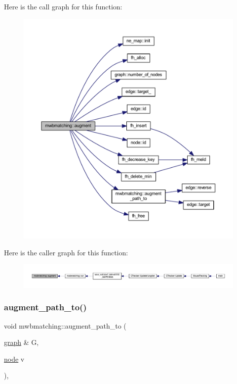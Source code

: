 Here is the call graph for this function\+:\nopagebreak
\begin{figure}[H]
\begin{center}
\leavevmode
\includegraphics[width=350pt]{classmwbmatching_adfb6ea829377c6ba08f6079d767d5a42_cgraph}
\end{center}
\end{figure}
Here is the caller graph for this function\+:\nopagebreak
\begin{figure}[H]
\begin{center}
\leavevmode
\includegraphics[width=350pt]{classmwbmatching_adfb6ea829377c6ba08f6079d767d5a42_icgraph}
\end{center}
\end{figure}
\mbox{\label{classmwbmatching_a241fe1b645070b1f3e96c0b100fb8a6f}} 
\subsubsection{\texorpdfstring{augment\+\_\+path\+\_\+to()}{augment\_path\_to()}}
{\footnotesize\ttfamily void mwbmatching\+::augment\+\_\+path\+\_\+to (\begin{DoxyParamCaption}\item[{\mbox{\hyperlink{classgraph}{graph}} \&}]{G,  }\item[{\mbox{\hyperlink{classnode}{node}}}]{v }\end{DoxyParamCaption})\hspace{0.3cm}{\ttfamily [inline]}, {\ttfamily [protected]}}



